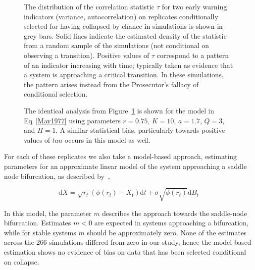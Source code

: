\documentclass[authoryear,review,12pt]{elsarticle}
\newcommand{\ud}{\mathrm{d}}
\newif\ifhavefigures
\newif\ifnohavefigures %
\begin{document}
\begin{figure}
  \begin{center}
    \ifhavefigures
    \fi
     \ifnohavefigures
     \hspace{6in}
    \fi
 \end{center}
  \caption{The distribution of the correlation statistic $\tau$ for two
  early warning indicators (variance, autocorrelation) on replicates
  conditionally selected for having collapsed by chance in simulations
  is shown in grey bars.  Solid lines indicate the estimated density of
  the statistic from a random sample of the simulations (not conditional
  on observing a transition). Positive values of $\tau$ correspond to
  a pattern of an indicator increasing with time; typically taken as
  evidence that a system is approaching a critical transition.  In these
  simulations, the pattern arises instead from the Prosecutor's fallacy
  of conditional selection.}
  \label{fig:indicator}
\end{figure}

\begin{figure}
  \begin{center}
    \ifhavefigures
    \fi
    \ifnohavefigures
     \hspace{6in}
    \fi
  \end{center}
  \caption{The identical analysis from Figure~\ref{fig:indicator} is shown for the model in Eq~\eqref{May1977} using parameters $r = 0.75$, $K=10$, $a=1.7$, $Q=3$, and $H=1$. A similar statistical bias, particularly towards positive values of $tau$ occurs in this model as well.}
  \label{fig:may}
\end{figure}



For each of these replicates we also take a model-based
approach, estimating parameters for an approximate linear
model of the system approaching a saddle node bifurcation, as
described by~\citet{Boettiger2012b},


\begin{equation}
\ud X = \sqrt{ r_t } (\phi(r_t) - X_t)\ud t + \sigma\sqrt{\phi(r_t) } \ud B_t \label{LSN}
\end{equation}


In this model, the parameter $m$
describes the approach towards the saddle-node bifurcation.  Estimates
$m < 0 $ are expected in systems approaching a bifurcation, while for
stable systems $m$ should be approximately zero. None of the estimates
across the 266 simulations differed from zero in our study, hence the
model-based estimation shows no evidence of bias on data that has been
selected conditional on collapse.
\end{document}
